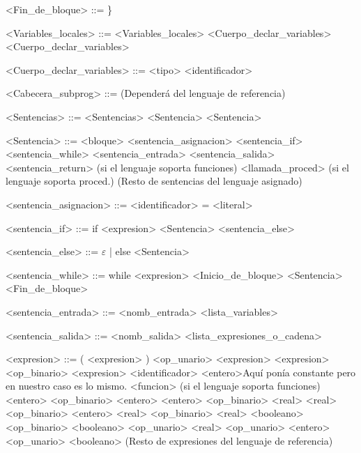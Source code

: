 \documentclass{scrartcl}
\begin{document}
\begin{grammar}
<Fin_de_bloque> ::= \}

<Variables_locales> ::= <Variables_locales> <Cuerpo_declar_variables>
\alt <Cuerpo_declar_variables>

<Cuerpo_declar_variables> ::= <tipo> <identificador> %

<Cabecera_subprog> ::= (Dependerá del lenguaje de referencia)

<Sentencias> ::= <Sentencias> <Sentencia>
\alt <Sentencia>

<Sentencia> ::= <bloque>
\alt <sentencia_asignacion>
\alt <sentencia_if>
\alt <sentencia_while>
\alt <sentencia_entrada>
\alt <sentencia_salida>
\alt <sentencia_return> (si el lenguaje soporta funciones)
\alt <llamada_proced> (si el lenguaje soporta proced.)
\alt (Resto de sentencias del lenguaje asignado)

<sentencia_asignacion> ::=  <identificador> = <literal>

<sentencia_if> ::= if <expresion>
 <Sentencia> <sentencia_else>
 
 <sentencia_else> ::= $\varepsilon$ | else <Sentencia>

<sentencia_while> ::= while <expresion> <Inicio_de_bloque>
<Sentencia>
<Fin_de_bloque>

<sentencia_entrada> ::= <nomb_entrada> <lista_variables>

<sentencia_salida> ::= <nomb_salida> <lista_expresiones_o_cadena>

<expresion> ::= ( <expresion> )
\alt <op_unario> <expresion>
\alt <expresion> <op_binario> <expresion>
\alt <identificador>
\alt <entero>Aquí ponía constante pero en nuestro caso es lo mismo.
\alt <funcion> (si el lenguaje soporta funciones)
\alt <entero> <op_binario> <entero>
\alt <entero> <op_binario> <real>
\alt <real> <op_binario> <entero>
\alt <real> <op_binario> <real>
\alt <booleano> <op_binario> <booleano>
\alt <op_unario> <real>
\alt <op_unario> <entero>
\alt <op_unario> <booleano>
\alt (Resto de expresiones del lenguaje de referencia)


\end{grammar}
\end{document}
